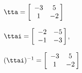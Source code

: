 {$\tta = \left[
\begin{array}{cc}
  -3 & 5 \\
 1 & -2
\end{array}\hskip -3pt \right]$
}
{$\ttai = \left[
\begin{array}{cc}
 -2 & -5\\
 -1 & -3
\end{array} \hskip -3pt
\right]$,

$(\ttai)^{-1} = \left[
\begin{array}{cc}
 -3 & 5 \\
 1 & -2
 \end{array}\hskip -3pt \right]$
}
